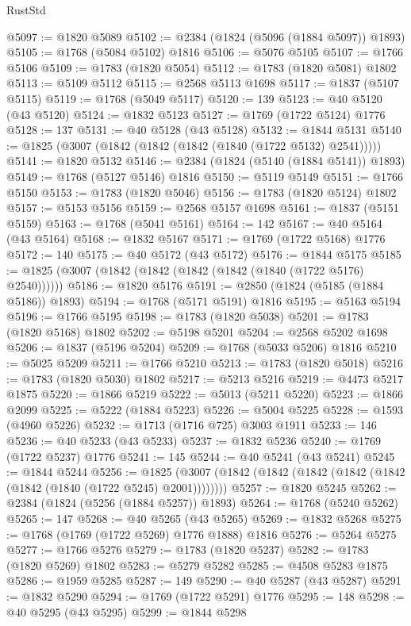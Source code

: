 \begin{lexlean}{RustStd}
\begin{coremodule}
@5097 := @1820 @5089
@5102 := @2384 (@1824 (@5096 (@1884 @5097)) @1893)
@5105 := @1768 (@5084 @5102) @1816
@5106 := @5076 @5105
@5107 := @1766 @5106
@5109 := @1783 (@1820 @5054)
@5112 := @1783 (@1820 @5081) @1802
@5113 := @5109 @5112
@5115 := @2568 @5113 @1698
@5117 := @1837 (@5107 @5115)
@5119 := @1768 (@5049 @5117)
@5120 := 139
@5123 := @40 @5120 (@43 @5120)
@5124 := @1832 @5123
@5127 := @1769 (@1722 @5124) @1776
@5128 := 137
@5131 := @40 @5128 (@43 @5128)
@5132 := @1844 @5131
@5140 := @1825 (@3007 (@1842 (@1842 (@1842 (@1840 (@1722 @5132) @2541)))))
@5141 := @1820 @5132
@5146 := @2384 (@1824 (@5140 (@1884 @5141)) @1893)
@5149 := @1768 (@5127 @5146) @1816
@5150 := @5119 @5149
@5151 := @1766 @5150
@5153 := @1783 (@1820 @5046)
@5156 := @1783 (@1820 @5124) @1802
@5157 := @5153 @5156
@5159 := @2568 @5157 @1698
@5161 := @1837 (@5151 @5159)
@5163 := @1768 (@5041 @5161)
@5164 := 142
@5167 := @40 @5164 (@43 @5164)
@5168 := @1832 @5167
@5171 := @1769 (@1722 @5168) @1776
@5172 := 140
@5175 := @40 @5172 (@43 @5172)
@5176 := @1844 @5175
@5185 := @1825 (@3007 (@1842 (@1842 (@1842 (@1842 (@1840 (@1722 @5176) @2540))))))
@5186 := @1820 @5176
@5191 := @2850 (@1824 (@5185 (@1884 @5186)) @1893)
@5194 := @1768 (@5171 @5191) @1816
@5195 := @5163 @5194
@5196 := @1766 @5195
@5198 := @1783 (@1820 @5038)
@5201 := @1783 (@1820 @5168) @1802
@5202 := @5198 @5201
@5204 := @2568 @5202 @1698
@5206 := @1837 (@5196 @5204)
@5209 := @1768 (@5033 @5206) @1816
@5210 := @5025 @5209
@5211 := @1766 @5210
@5213 := @1783 (@1820 @5018)
@5216 := @1783 (@1820 @5030) @1802
@5217 := @5213 @5216
@5219 := @4473 @5217 @1875
@5220 := @1866 @5219
@5222 := @5013 (@5211 @5220)
@5223 := @1866 @2099
@5225 := @5222 (@1884 @5223)
@5226 := @5004 @5225
@5228 := @1593 (@4960 @5226)
@5232 := @1713 (@1716 @725) @3003 @1911
@5233 := 146
@5236 := @40 @5233 (@43 @5233)
@5237 := @1832 @5236
@5240 := @1769 (@1722 @5237) @1776
@5241 := 145
@5244 := @40 @5241 (@43 @5241)
@5245 := @1844 @5244
@5256 := @1825 (@3007 (@1842 (@1842 (@1842 (@1842 (@1842 (@1842 (@1840 (@1722 @5245) @2001))))))))
@5257 := @1820 @5245
@5262 := @2384 (@1824 (@5256 (@1884 @5257)) @1893)
@5264 := @1768 (@5240 @5262)
@5265 := 147
@5268 := @40 @5265 (@43 @5265)
@5269 := @1832 @5268
@5275 := @1768 (@1769 (@1722 @5269) @1776 @1888) @1816
@5276 := @5264 @5275
@5277 := @1766 @5276
@5279 := @1783 (@1820 @5237)
@5282 := @1783 (@1820 @5269) @1802
@5283 := @5279 @5282
@5285 := @4508 @5283 @1875
@5286 := @1959 @5285
@5287 := 149
@5290 := @40 @5287 (@43 @5287)
@5291 := @1832 @5290
@5294 := @1769 (@1722 @5291) @1776
@5295 := 148
@5298 := @40 @5295 (@43 @5295)
@5299 := @1844 @5298

\end{coremodule}
\end{lexlean}
